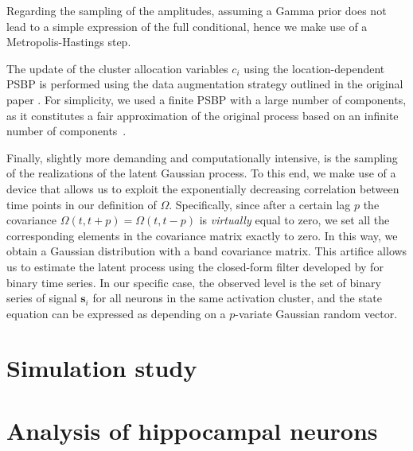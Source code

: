 Regarding the sampling of the amplitudes, assuming a Gamma prior does not lead to a simple expression of the full conditional, hence we make use of a Metropolis-Hastings step.

The update of the cluster allocation variables $c_i$ using the location-dependent PSBP is performed using the data augmentation strategy outlined in the original paper \parencite{rodriguez2011}. For simplicity, we used a finite PSBP with a large number of components, as it constitutes a fair approximation of the original process based on an infinite number of components~\parencite{rodriguez2011, ishwaran2001}.

Finally, slightly more demanding and computationally intensive, is the sampling of the realizations of the latent Gaussian process. To this end, we make use of a device that allows us to exploit the exponentially decreasing correlation between time points in our definition of $\Omega$. Specifically, since after a certain lag $p$ the covariance $\Omega(t,t+p)=\Omega(t,t-p)$ is \textit{virtually} equal to zero, we set all the corresponding elements in the covariance matrix exactly to zero. In this way, we obtain a Gaussian distribution with a band covariance matrix. This artifice allows us to estimate the latent process using the closed-form filter developed by \cite{fasano2021} for binary time series. In our specific case, the observed level is the set of binary series of signal $\bm{s}_i$ for all neurons in the same activation cluster, and the state equation can be expressed as depending on a $p$-variate Gaussian random vector.


\section{Simulation study}

\section{Analysis of hippocampal neurons}




